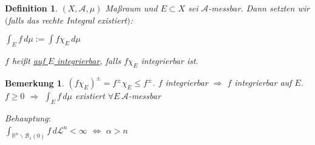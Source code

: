 \documentclass[11pt]{memoir}
\theoremstyle{changebreak}
\newtheorem{Definition}{Definition}[chapter]
\newtheorem{Bemerkung}{Bemerkung}[chapter]
\begin{document}
\begin{Definition}
$(X, \mathscr A, \mu)$ Maßraum und $E \subset X$ sei $\mathscr A$-messbar. Dann setzten wir $($falls das rechte Integral existiert$)$:
\begin{center}
	$\int_E f \, d\mu := \int f \chi_E \, d\mu$
\end{center}
$f$ heißt \underline{auf $E$ integrierbar}, falls $f \chi_E$ integrierbar ist.
\end{Definition}

\begin{Bemerkung}
$(f \chi_E)^\pm = f^\pm \chi_E \leq f^\pm$. $f$ integrierbar $\Rightarrow$ $f$ integrierbar auf $E$. \\
$f \geq 0$ $\Rightarrow$ $\int_E f \, d\mu$ existiert $\forall E \, \mathscr A$-messbar
\end{Bemerkung}


\emph{Behauptung}: \\
$\int_{\mathbb R^n \backslash \mathscr B_1 (0)} f \, d\mathscr L^n < \infty$ $\Leftrightarrow$ $\alpha > n$




\end{document}
